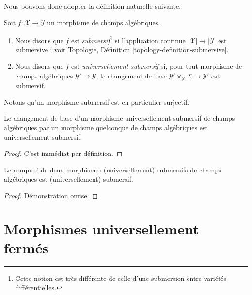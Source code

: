 \noindent
Nous pouvons donc adopter la définition naturelle suivante.

\begin{definition}
\label{definition-submersive}
Soit $f : \mathcal{X} \to \mathcal{Y}$ un morphisme de champs algébriques.
\begin{enumerate}
\item Nous disons que $f$ est {\it submersif}\footnote{Cette notion est
très différente de celle d'une submersion entre variétés différentielles.}
si l'application continue $|\mathcal{X}| \to |\mathcal{Y}|$ est submersive ;
voir Topologie, Définition \ref{topology-definition-submersive}.
\item Nous disons que $f$ est {\it universellement submersif} si, pour tout
morphisme de champs algébriques $\mathcal{Y}' \to \mathcal{Y}$,
le changement de base
$\mathcal{Y}' \times_\mathcal{Y} \mathcal{X} \to \mathcal{Y}'$
est submersif.
\end{enumerate}
\end{definition}

\noindent
Notons qu'un morphisme submersif est en particulier surjectif.

\begin{lemma}
\label{lemma-base-change-universally-submersive}
Le changement de base d'un morphisme universellement submersif de champs
algébriques par un morphisme quelconque de champs algébriques est
universellement submersif.
\end{lemma}

\begin{proof}
C'est immédiat par définition.
\end{proof}

\begin{lemma}
\label{lemma-composition-universally-submersive}
Le composé de deux morphismes (universellement) submersifs de champs
algébriques est (universellement) submersif.
\end{lemma}

\begin{proof}
Démonstration omise.
\end{proof}












\section{Morphismes universellement fermés}
\label{section-universally-closed}

